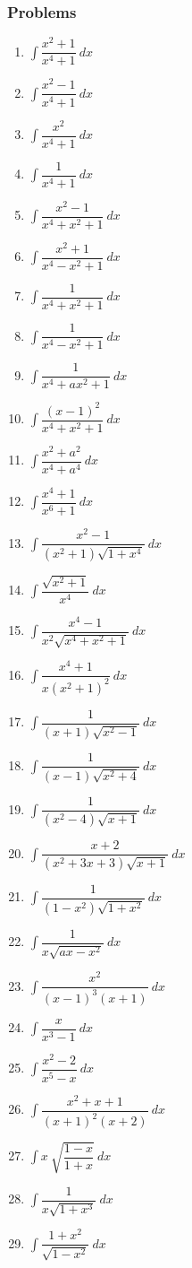 \documentclass[12pt,a4paper,twoside]{book}
\newcommand{\dint}[1]{\displaystyle{\int #1 \  dx}}
\begin{document}
\subsubsection{Problems}
\begin{multicols}{2}
\begin{enumerate}
\item $\dint{\dfrac{x^2+1}{x^4+1}}$
\item $\dint{\dfrac{x^2-1}{x^4+1}}$
\item $\dint{\dfrac{x^2}{x^4+1}}$
\item $\dint{\dfrac{1}{x^4+1}}$

\item $\dint{\dfrac{x^2-1}{x^4+x^2+1}}$
\item $\dint{\dfrac{x^2+1}{x^4-x^2+1}}$
\item $\dint{\dfrac{1}{x^4+x^2+1}}$
\item $\dint{\dfrac{1}{x^4-x^2+1}}$
\item $\dint{\dfrac{1}{x^4+ax^2+1}}$
\item $\dint{\dfrac{(x-1)^2}{x^4+x^2+1}}$
\item $\dint{\dfrac{x^2+a^2}{x^4+a^4}}$
\item $\dint{\dfrac{x^4+1}{x^6+1}}$
\item $\dint{\dfrac{x^2-1}{(x^2+1)\sqrt{1+x^4}}}$
\item $\dint{\dfrac{\sqrt{x^2+1}}{x^4}}$
\item $\dint{\dfrac{x^4-1}{x^2 \sqrt{x^4+x^2+1}}}$
\item $\dint{\dfrac{x^4+1}{x(x^2+1)^2}}$
\item $\dint{\dfrac{1}{(x+1)\sqrt{x^2-1}}}$
\item $\dint{\dfrac{1}{(x-1)\sqrt{x^2+4}}}$
\item $\dint{\dfrac{1}{(x^2-4)\sqrt{x+1}}}$
\item $\dint{\dfrac{x+2}{(x^2+3x+3)\sqrt{x+1}}}$
\item $\dint{\dfrac{1}{(1-x^2)\sqrt{1+x^2}}}$
\item $\dint{\dfrac{1}{x\sqrt{ax-x^2}}}$
\item $\dint{\dfrac{x^2}{(x-1)^3(x+1)}}$
\item $\dint{\dfrac{x}{x^3-1}}$
\item $\dint{\dfrac{x^2-2}{x^5-x}}$
\item $\dint{\dfrac{x^2+x+1}{(x+1)^2(x+2)}}$
\item $\dint{x\ \sqrt{\dfrac{1-x}{1+x}}}$
\item $\dint{\dfrac{1}{x\sqrt{1+x^3}}}$
\item $\dint{\dfrac{1+x^2}{\sqrt{1-x^2}}}$


\end{enumerate}
\end{multicols}
\end{document}
